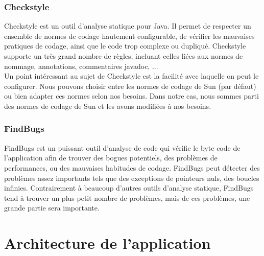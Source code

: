 \documentclass[10pt,a4paper]{article}
\begin{document}
\subsubsection{Checkstyle}
Checkstyle est un outil d’analyse statique pour Java. Il permet de respecter un ensemble de normes de codage hautement configurable, de vérifier les mauvaises pratiques de codage, ainsi que le code trop complexe ou dupliqué. Checkstyle supporte un très grand nombre de règles, incluant celles liées aux normes de nommage, annotations, commentaires javadoc, ... \\
Un point intéressant au sujet de Checkstyle est la facilité avec laquelle on peut le configurer. Nous pouvons choisir entre les normes de codage de Sun (par défaut) ou bien adapter ces normes selon nos besoins. Dans notre cas, nous sommes parti des normes de codage de Sun et les avons modifiées à nos besoins.

\subsubsection{FindBugs}
FindBugs est un puissant outil d’analyse de code qui vérifie le byte code de l’application afin de trouver des bogues potentiels, des problèmes de performances, ou des mauvaises habitudes de codage. FindBugs peut détecter des problèmes assez importants tels que des exceptions de pointeurs nuls, des boucles infinies. Contrairement à beaucoup d’autres outils d’analyse statique, FindBugs tend à trouver un plus petit nombre de problèmes, mais de ces problèmes, une grande partie sera importante.


\newpage
\section{Architecture de l'application}
\end{document}
